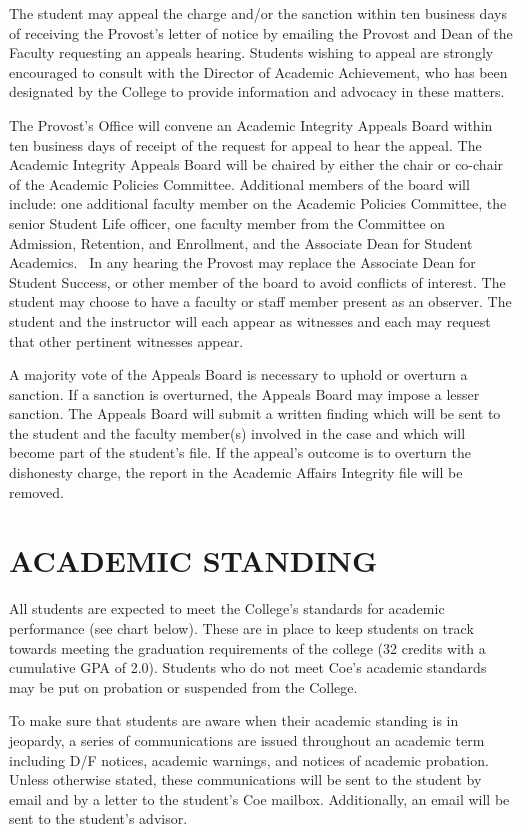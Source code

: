 \documentclass[
  letterpaper,
]{scrbook}
\begin{document}
The student may appeal the charge and/or the sanction within ten
business days of receiving the Provost's letter of notice by emailing
the Provost and Dean of the Faculty requesting an appeals hearing.
Students wishing to appeal are strongly encouraged to consult with the
Director of Academic Achievement, who has been designated by the College
to provide information and advocacy in these matters.

The Provost's Office will convene an Academic Integrity Appeals Board
within ten business days of receipt of the request for appeal to hear
the appeal. The Academic Integrity Appeals Board will be chaired by
either the chair or co-chair of the Academic Policies Committee.
Additional members of the board will include: one additional faculty
member on the Academic Policies Committee, the senior Student Life
officer, one faculty member from the Committee on Admission, Retention,
and Enrollment, and the Associate Dean for Student Academics. ~In any
hearing the Provost may replace the Associate Dean for Student Success,
or other member of the board to avoid conflicts of interest. The student
may choose to have a faculty or staff member present as an observer. The
student and the instructor will each appear as witnesses and each may
request that other pertinent witnesses appear.

A majority vote of the Appeals Board is necessary to uphold or overturn
a sanction. If a sanction is overturned, the Appeals Board may impose a
lesser sanction. The Appeals Board will submit a written finding which
will be sent to the student and the faculty member(s) involved in the
case and which will become part of the student's file. If the appeal's
outcome is to overturn the dishonesty charge, the report in the Academic
Affairs Integrity file will be removed.

\hypertarget{academic-standing}{%
\chapter{ACADEMIC STANDING}\label{academic-standing}}

All students are expected to meet the College's standards for academic
performance (see chart below). These are in place to keep students on
track towards meeting the graduation requirements of the college (32
credits with a cumulative GPA of 2.0). Students who do not meet Coe's
academic standards may be put on probation or suspended from the
College.

To make sure that students are aware when their academic standing is in
jeopardy, a series of communications are issued throughout an academic
term including D/F notices, academic warnings, and notices of academic
probation. Unless otherwise stated, these communications will be sent to
the student by email and by a letter to the student's Coe mailbox.
Additionally, an email will be sent to the student's advisor.
\end{document}
